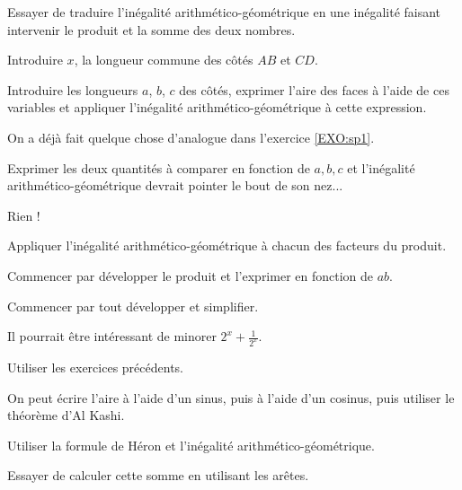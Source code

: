 \begin{Hint}{58}
Essayer de traduire l'inégalité arithmético-géométrique en une inégalité faisant intervenir le produit et la somme des deux nombres.
\end{Hint}
\begin{Hint}{59}
Introduire $x$, la longueur commune des côtés $AB$ et $CD$.
\end{Hint}
\begin{Hint}{60}
Introduire les longueurs $a$, $b$, $c$ des côtés, exprimer l'aire des faces à l'aide de ces variables et appliquer l'inégalité arithmético-géométrique à cette expression.
\end{Hint}
\begin{Hint}{61}
On a déjà fait quelque chose d'analogue dans l'exercice \ref{EXO:sp1}.
\end{Hint}
\begin{Hint}{62}
Exprimer les deux quantités à comparer en fonction de $a,b,c$ et l'inégalité arithmético-géométrique devrait pointer le bout de son nez...
\end{Hint}
\begin{Hint}{63}
 Rien !
 
\end{Hint}
\begin{Hint}{64}
Appliquer l'inégalité arithmético-géométrique à chacun des facteurs du produit.
\end{Hint}
\begin{Hint}{65}
Commencer par développer le produit et l'exprimer en fonction de $ab$.
\end{Hint}
\begin{Hint}{66}
Commencer par tout développer et simplifier.
\end{Hint}
\begin{Hint}{67}
Il pourrait être intéressant de minorer $2^x+\frac{1}{2^x}$.
\end{Hint}
\begin{Hint}{71}
Utiliser les exercices précédents.
\end{Hint}
\begin{Hint}{74}
 On peut écrire l'aire à l'aide d'un sinus, puis à l'aide d'un cosinus, puis utiliser le théorème d'Al Kashi.
\end{Hint}
\begin{Hint}{75}
Utiliser la formule de Héron et l'inégalité arithmético-géométrique.
\end{Hint}
\begin{Hint}{78}
Essayer de calculer cette somme en utilisant les arêtes.
\end{Hint}
